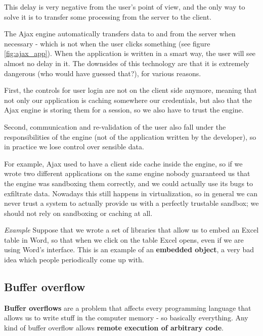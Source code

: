This delay is very negative from the user’s point of view, and the only way to solve it is to transfer some processing from the server to the client.

The Ajax engine automatically transfers data to and from the server when necessary - which is not when the user clicks something (see figure \ref{fig:ajax_app}). When the application is written in a smart way, the user will see almost no delay in it. The downsides of this technology are that it is extremely dangerous (who would have guessed that?), for various reasons.

First, the controls for user login are not on the client side anymore, meaning that not only our application is caching somewhere our credentials, but also that the Ajax engine is storing them for a session, so we also have to trust the engine.

Second, communication and re-validation of the user also fall under the responsibilities of the engine (not of the application written by the developer), so in practice we lose control over sensible data.

For example, Ajax used to have a client side cache inside the engine, so if we wrote two different applications on the same engine nobody guaranteed us that the engine was sandboxing them correctly, and we could actually use its bugs to exfiltrate data. Nowadays this still happens in virtualization, so in general we can never trust a system to actually provide us with a perfectly trustable sandbox; we should not rely on sandboxing or caching at all.

\vspace{0.5em}

\emph{Example} Suppose that we wrote a set of libraries that allow us to embed an Excel table in Word, so that when we click on the table Excel opens, even if we are using Word’s interface. This is an example of an \textbf{embedded object}, a very bad idea which people periodically come up with.

\vspace{0.5em}

\subsection{Buffer overflow}
\textbf{Buffer overflows} are a problem that affects every programming language that allows us to write stuff in the computer memory - so basically everything. Any kind of buffer overflow allows \textbf{remote execution of arbitrary code}.

